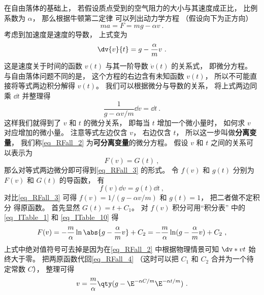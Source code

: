 

在自由落体的基础上， 若假设质点受到的空气阻力的大小与其速度成正比， 比例系数为 $\alpha$， 那么根据牛顿第二定律 可以列出动力学方程 （假设向下为正方向）
\begin{equation}
ma = F = mg - \alpha v~.
\end{equation}
考虑到加速度是速度的导数， 上式变为
\begin{equation}\label{eq_RFall_2}
\dv{v}{t} = g - \frac{\alpha}{m} v~.
\end{equation}
这是速度关于时间的函数 $v(t)$ 与其一阶导数 $\dot v(t)$ 的关系式， 即微分方程。 与自由落体问题不同的是， 这个方程的右边含有未知函数 $v(t)$， 所以不可能直接将等式两边积分解得 $v(t)$。 我们可以根据微分与导数的关系， 将上式两边同乘 $\dd{t}$ 并整理得
\begin{equation}\label{eq_RFall_3}
\frac{1}{g - \alpha v/m} \dd{v} = \dd{t}~.
\end{equation}
这样我们就得到了 $v$ 和 $t$ 的微分关系， 即每当 $t$ 增加一个微小量时， 如何求 $v$ 对应增加的微小量。 注意等式左边仅含 $v$， 右边仅含 $t$， 所以这一步叫做\textbf{分离变量}， 我们称\autoref{eq_RFall_2} 为\textbf{可分离变量}的微分方程。 假设 $v$ 和 $t$ 之间的关系可以表示为
\begin{equation}\label{eq_RFall_4}
F(v) = G(t)~,
\end{equation}
那么对等式两边微分即可得到\autoref{eq_RFall_3} 的形式。 令 $f(v)$ 和 $g(t)$ 分别为 $F(v)$ 和 $G(t)$ 的导函数， 有
\begin{equation}\label{eq_RFall_5}
f(v) \dd{v} = g(t) \dd{t}~,
\end{equation}
对比\autoref{eq_RFall_3} 可得 $f(v) = 1/(g - \alpha v/m)$ 和 $g(t) = 1$， 把二者做不定积分 得原函数。 首先显然 $G(t) = t + C_1$。 对 $f(v)$ 积分可用“积分表” 中的\autoref{eq_ITable_1} 和 \autoref{eq_ITable_10} 得
\begin{equation}
F(v) = -\frac{m}{\alpha} \ln\abs{g - \frac{\alpha}{m} v} + C_2 = -\frac{m}{\alpha} \ln(g - \frac{\alpha}{m} v) + C_2~,
\end{equation}
 上式中绝对值符号可去掉是因为在\autoref{eq_RFall_2} 中根据物理情景可知 $\dv*{v}{t}$ 始终大于零。 把两原函数代回\autoref{eq_RFall_4} （这时可以把 $C_1$ 和 $C_2$ 合并为一个待定常数 $C$）， 整理可得
\begin{equation}
v = \frac{m}{\alpha} \qty( g - \E^{-\alpha C/m} \E^{-\alpha t/m} )~.
\end{equation}
